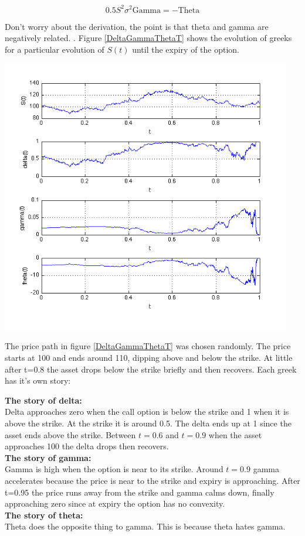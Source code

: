 \[ 0.5 S^2 \sigma^2 \mbox{Gamma} = -\mbox{Theta}\]

Don't worry about the derivation, the point is that theta and gamma are negatively related. . Figure \ref{DeltaGammaThetaT} shows the evolution of greeks for a particular evolution of $S(t)$ until the expiry of the option.

\begin{center}
\includegraphics[width=5in]{pics/DeltaGammaThetaT.png}
\label{DeltaGammaThetaT}
\end{center}

The price path in figure \ref{DeltaGammaThetaT} was chosen randomly. The price starts at 100 and ends around 110, dipping above and below the strike. At little after t=0.8 the asset drops below the strike briefly and then recovers. Each greek has it's own story:


\textbf{The story of delta:}\\ Delta approaches zero when the call option is below the strike and 1 when it is above the strike. At the strike it is around 0.5.  The delta ends up at 1 since the asset ends above the strike. Between $t=0.6$ and $t=0.9$ when the asset approaches 100 the delta drops then recovers.\\
\textbf{The story of gamma:}\\ Gamma is high when the option is near to its strike. Around  $t=0.9$ gamma accelerates because the price is near to the strike and expiry is approaching. After t=0.95 the price runs away from the strike and gamma calms down, finally approaching zero since at expiry the option has no convexity.\\
\textbf{The story of theta:}\\ Theta does the opposite thing to gamma. This is because theta hates gamma.


